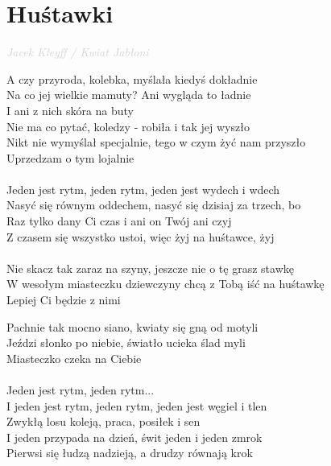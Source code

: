 \documentclass[a5paper, 10pt]{book}
\begin{document}
\section{Huśtawki}\textcolor{lightgray}{\textit{Jacek Kleyff / Kwiat Jabłoni}}\vspace*{2mm}\\
\begin{minipage}[t]{0.85\textwidth}
  A czy przyroda, kolebka, myślała kiedyś dokładnie\\
  Na co jej wielkie mamuty? Ani wygląda to ładnie\\
  I ani z nich skóra na buty \vspace*{2mm}
  \\
  Nie ma co pytać, koledzy - robiła i tak jej wyszło\\
  Nikt nie wymyślał specjalnie, tego w czym żyć nam przyszło\\
  Uprzedzam o tym lojalnie\\
  \\
  \hspace*{5mm}Jeden jest rytm, jeden rytm, jeden jest wydech i wdech\\
  \hspace*{5mm}Nasyć się równym oddechem, nasyć się dzisiaj za trzech, bo\\
  \hspace*{5mm}Raz tylko dany Ci czas i ani on Twój ani czyj\\
  \hspace*{5mm}Z czasem się wszystko ustoi, więc żyj na huśtawce, żyj\\
  \\
  Nie skacz tak zaraz na szyny, jeszcze nie o tę grasz stawkę\\
  W wesołym miasteczku dziewczyny chcą z Tobą iść na huśtawkę\\
  Lepiej Ci będzie z nimi \vspace*{2mm}

  Pachnie tak mocno siano, kwiaty się gną od motyli\\
  Jeździ słonko po niebie, światło ucieka ślad myli\\
  Miasteczko czeka na Ciebie\\
  \\
  \hspace*{7mm}Jeden jest rytm, jeden rytm...\vspace*{2mm}
  \\
  \hspace*{5mm}I jeden jest rytm, jeden rytm, jeden jest węgiel i tlen\\
  \hspace*{5mm}Zwykłą losu koleją, praca, posiłek i sen\\
  \hspace*{5mm}I jeden przypada na dzień, świt jeden i jeden zmrok\\
  \hspace*{5mm}Pierwsi się łudzą nadzieją, a drudzy równają krok\\
\end{minipage}
\end{document}
